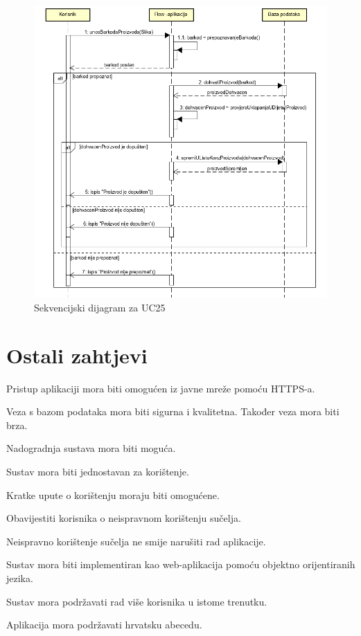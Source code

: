 				
				\begin{figure}[H]
				\includegraphics[scale=0.95]{dijagrami/Sekvencijski/SD25.PNG}
				\centering
				\caption{Sekvencijski dijagram za UC25}
				\label{fig:promjene}
				\end{figure}
				\eject
				
				
	
		\section{Ostali zahtjevi}
			 
			 \begin{packed_item}
			 	
			 	\item Pristup aplikaciji mora biti omogućen iz javne mreže pomoću HTTPS-a.
			 	\item Veza s bazom podataka mora biti sigurna i kvalitetna. Također veza mora biti brza.
			 	\item Nadogradnja sustava mora biti moguća.
			 	\item Sustav mora biti jednostavan za korištenje.
			 	\item Kratke upute o korištenju moraju biti omogućene.
			 	\item Obavijestiti korisnika o neispravnom korištenju sučelja.
			 	\item Neispravno korištenje sučelja ne smije narušiti rad aplikacije.
			 	\item Sustav mora biti implementiran kao web-aplikacija pomoću objektno orijentiranih jezika.
			 	\item Sustav mora podržavati rad više korisnika u istome trenutku.
			 	\item Aplikacija mora podržavati hrvatsku abecedu.
			 	
			 \end{packed_item}
			 
			 
	
